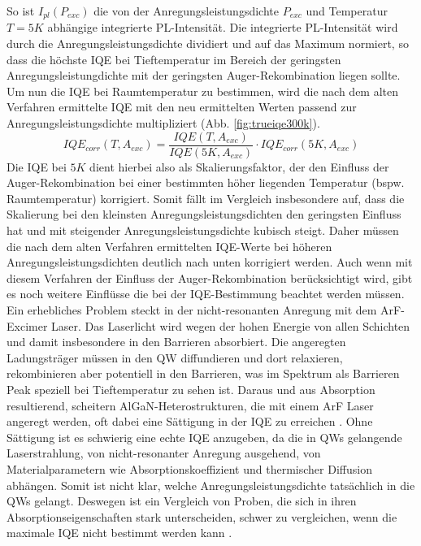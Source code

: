 \noindent
\newline
So ist $I_{pl}(P_{exc})$ die von der Anregungsleistungsdichte $P_{exc}$ und Temperatur $T = 5K$ abhängige integrierte PL-Intensität. Die integrierte PL-Intensität wird durch die Anregungsleistungsdichte dividiert und auf das Maximum normiert, so dass die höchste IQE bei Tieftemperatur im Bereich der geringsten Anregungsleistungdichte mit der geringsten Auger-Rekombination liegen sollte. Um nun die IQE bei Raumtemperatur zu bestimmen, wird die nach dem alten Verfahren ermittelte IQE mit den neu ermittelten Werten passend zur Anregungsleistungsdichte multipliziert (Abb. \ref{fig:trueiqe300k}). 
\begin{equation}
    IQE_{corr}(T, A_{exc}) = \frac{IQE(T,A_{exc})}{IQE(5K,A_{exc})} \cdot IQE_{corr}(5K,A_{exc})
    \label{eq:iqetrue300k}
\end{equation}
Die IQE bei $5K$ dient hierbei also als Skalierungsfaktor, der den Einfluss der Auger-Rekombination bei einer bestimmten höher liegenden Temperatur (bspw. Raumtemperatur) korrigiert. Somit fällt im Vergleich insbesondere auf, dass die Skalierung bei den kleinsten Anregungsleistungsdichten den geringsten Einfluss hat und mit steigender Anregungsleistungsdichte kubisch steigt. Daher müssen die nach dem alten Verfahren ermittelten IQE-Werte bei höheren Anregungsleistungsdichten deutlich nach unten korrigiert werden. \newline
Auch wenn mit diesem Verfahren der Einfluss der Auger-Rekombination berücksichtigt wird, gibt es noch weitere Einflüsse die bei der IQE-Bestimmung beachtet werden müssen. Ein erhebliches Problem steckt in der nicht-resonanten Anregung mit dem ArF-Excimer Laser. Das Laserlicht wird wegen der hohen Energie von allen Schichten und damit insbesondere in den Barrieren absorbiert. Die angeregten Ladungsträger müssen in den QW diffundieren und dort relaxieren, rekombinieren aber potentiell in den Barrieren, was im Spektrum als Barrieren Peak speziell bei Tieftemperatur zu sehen ist.
\newline
Daraus und aus Absorption resultierend, scheitern AlGaN-Heterostrukturen, die mit einem ArF Laser angeregt werden, oft dabei eine Sättigung in der IQE zu erreichen \cite{doi:10.1063/1.4965298}. Ohne Sättigung ist es schwierig eine echte IQE anzugeben, da die in QWs gelangende Laserstrahlung, von nicht-resonanter Anregung ausgehend, von Materialparametern wie Absorptionskoeffizient und thermischer Diffusion abhängen. Somit ist nicht klar, welche Anregungsleistungsdichte tatsächlich in die QWs gelangt. Deswegen ist ein Vergleich von Proben, die sich in ihren Absorptionseigenschaften stark unterscheiden, schwer zu vergleichen, wenn die maximale IQE nicht bestimmt werden kann \cite{doi:10.1063/1.5044383}. 

